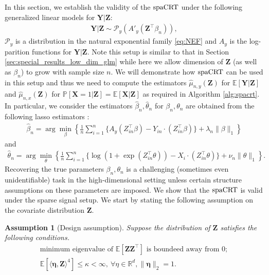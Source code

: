 \documentclass[12pt]{article}
\newtheorem{assumption}{Assumption}
\theoremstyle{definition}
\def\P{\mathbb{P}}
\def\P{\mathbb{P}}
\newcommand{\E}{\mathbb E}								%
\renewcommand{\P}{\mathbb{P}}							%
\newcommand{\prx}{\bm X}								%
\newcommand{\prz}{\bm Z}								%
\newcommand{\srz}{Z}									%
\newcommand{\pry}{{\bm Y}}								%
\newcommand{\spacrt}{\textnormal{spaCRT}}               %
\begin{document}
In this section, we establish the validity of the $\spacrt$ under the following generalized linear models for $\pry|\prz$:
\begin{align*}
  \pry|\prz\sim \mathcal{P}_y(A'_{y}(\prz^\top \beta_{n})),
\end{align*}
$\mathcal{P}_y$ is a distribution in the natural exponential family \eqref{eq:NEF} and $A_y$ is the log-parition functions for $\pry|\prz$. Note this setup is similar to that in Section \ref{sec:special_results_low_dim_glm} while here we allow dimension of $\prz$ (as well as $\beta_n$) to grow with sample size $n$. We will demonstrate how $\spacrt$ can be used in this setup and thus we need to compute the estimators $\widehat{\mu}_{n,y}(\prz)$ for $\E[\pry|\prz]$ and $\widehat{\mu}_{n,x}(\prz)$ for $\P[\prx=1|\prz]=\E[\prx|\prz]$ as required in Algorithm \ref{alg:spacrt}. In particular, we consider the estimators $\widehat{\beta}_n,\widehat{\theta}_n$ for $\beta_n,\theta_n$ are obtained from the following lasso estimators \citep{tibshirani1996regression}:
\begin{align}\label{eq:Y_on_X_Z_lasso}
  \widehat{\beta}_n=\arg\min_{\beta}\left\{\frac{1}{n}\sum_{i=1}^n \{A_y(\srz_{in}^\top\beta)-Y_{in}\cdot (\srz_{in}^\top\beta)\}+\lambda_n\|\beta\|_1\right\}
\end{align}
and 
\begin{align}\label{eq:X_on_Z_lasso}
  \widehat{\theta}_n=\arg\min_{\theta}\left\{\frac{1}{n}\sum_{i=1}^n \{\log(1 + \exp(\srz_{in}^\top\theta))-X_i\cdot (\srz_{in}^\top\theta)\}+\nu_n\|\theta\|_1\right\}.
\end{align}
Recovering the true parameters $\beta_n,\theta_n$ is a challenging (sometimes even unidentifiable) task in the high-dimensional setting unless certain structure assumptions on these parameters are imposed. We show that the $\spacrt$ is valid under the sparse signal setup. We start by stating the following assumption on the covariate distribution $\prz$.

\begin{assumption}[Design assumption]\label{assu:design_assumption}
  Suppose the distribution of $\prz$ satisfies the following conditions.
  \begin{align}
    \text{minimum eigenvalue of }\E[\prz\prz^\top]\text{ is boundeed away from }0;\label{eq:boundedness_eigenvalue}\\
    \E[\langle \bm \eta, \prz \rangle^4]\leq \kappa <\infty,\  \forall \eta\in\mathbb{R}^{d}, \|\bm\eta\|_2=1.\label{eq:fourth_moment_XZ}
  \end{align} 
\end{assumption}
\end{document}
